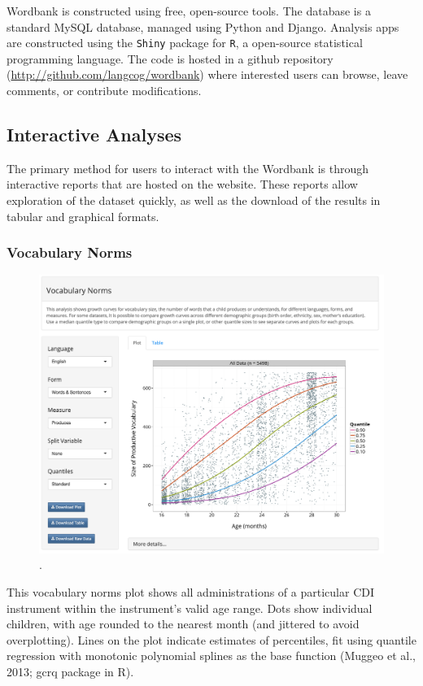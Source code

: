 \documentclass[man,noapacite]{apa2}
\begin{document}
Wordbank is constructed using free, open-source tools. The database is a standard MySQL database, managed using Python and Django. Analysis apps are constructed using the \texttt{Shiny} package for \texttt{R}, a open-source statistical programming language.  The code is hosted in a github repository (\url{http://github.com/langcog/wordbank}) where interested users can browse, leave comments, or contribute modifications. 

\subsection{Interactive Analyses}

The primary method for users to interact with the Wordbank is through interactive reports that are hosted on the website. These reports allow exploration of the dataset quickly, as well as the download of the results in tabular and graphical formats. 

\subsubsection{Vocabulary Norms}

\begin{figure}[h!]
\includegraphics[width=6.5in]{figures/normsapp.png}
\caption{\label{fig:norms}.}
\end{figure}

This vocabulary norms plot shows all administrations of a particular CDI instrument within the instrument's valid age range. Dots show individual children, with age rounded to the nearest month (and jittered to avoid overplotting). Lines on the plot indicate estimates of percentiles, fit using quantile regression with monotonic polynomial splines as the base function (Muggeo et al., 2013; gcrq package in R).
\end{document}
